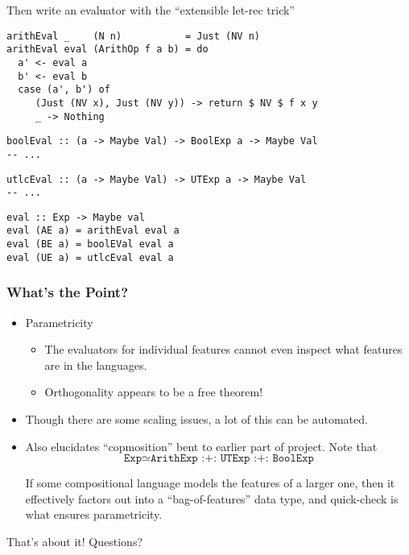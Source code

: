 \documentclass{beamer}
\begin{document}
\begin{frame}[fragile]
  Then write an evaluator with the ``extensible let-rec trick''
\begin{verbatim}
arithEval _    (N n)           = Just (NV n)
arithEval eval (ArithOp f a b) = do 
  a' <- eval a
  b' <- eval b
  case (a', b') of 
     (Just (NV x), Just (NV y)) -> return $ NV $ f x y
     _ -> Nothing
\end{verbatim}
\begin{verbatim}
boolEval :: (a -> Maybe Val) -> BoolExp a -> Maybe Val
-- ...
\end{verbatim}
\begin{verbatim}
utlcEval :: (a -> Maybe Val) -> UTExp a -> Maybe Val
-- ...
\end{verbatim}
\begin{verbatim}
eval :: Exp -> Maybe val
eval (AE a) = arithEval eval a
eval (BE a) = boolEVal eval a
eval (UE a) = utlcEval eval a
\end{verbatim}

\end{frame}

\begin{frame}
  \frametitle{What's the Point?}
    \begin{itemize}
    \item Parametricity
      \begin{itemize}
      \item The evaluators for individual features cannot even inspect what
        features are in the languages.
      \item Orthogonality appears to be a free theorem!
      \end{itemize}
      \pause
    \item Though there are some scaling issues, a lot of this can be automated.
      \pause
    \item Also elucidates ``copmosition'' bent to earlier part of project. Note
      that 
      \[
        \texttt{Exp}  \simeq \texttt{ArithExp :+: UTExp :+: BoolExp}
      \]

      If some compositional language models the features of a larger one, then
      it effectively factors out into a ``bag-of-features'' data type, and
      quick-check is what ensures parametricity.
    \end{itemize}
  
\end{frame}
\begin{frame}
  
\centerline{That's about it! Questions?}
  
\end{frame}
\end{document}
